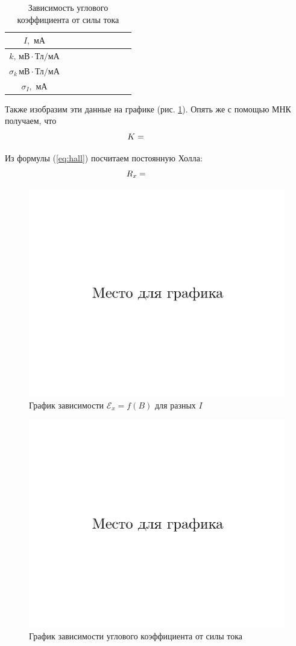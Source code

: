 \documentclass{physlab}
\begin{document}
\begin{table}[H]
	\centering
	\caption{Зависимость углового коэффициента от силы тока}
	\label{tbl:I(k)}
	\begin{tabu}{|c|X[c]|X[c] |X[c]| X[c]| X[c]| X[c]| X[c]| X[c]|}
		\hline
		$I, \text{ мА}$                                           & \val    &    &     &    &     &     &    &    \\ \hline
		$k,\,\text{мВ}\cdot\text{Тл}\slash\text{мА}$          & & & & & & & &\\ \hline
		$\sigma_k\,\text{мВ}\cdot\text{Тл}\slash\text{мА}$ & & & & & & & &  \\ \hline
		$\sigma_I, \text{ мА}$                                 &                                              \\\hline
	\end{tabu}
\end{table}
Также изобразим эти данные на графике (рис. \ref{img:k(I)}). Опять же с помощью МНК получаем, что
\[K = \val\]

Из формулы (\ref{eq:hall}) посчитаем постоянную Холла:
\[ R_x = \val \]

\begin {figure}[H]
\centering
	\includegraphics[width = 0.65 \textwidth]{foo}
\caption{График зависимости $\mathscr{E}_x = f(B)$ для разных $I$}
\end {figure}
	
\begin {figure}[H]
\centering
    \includegraphics[width = 0.65 \textwidth]{foo}
\caption{График зависимости углового коэффициента от силы тока}
\label{img:k(I)}
\end {figure}
\end{document}
